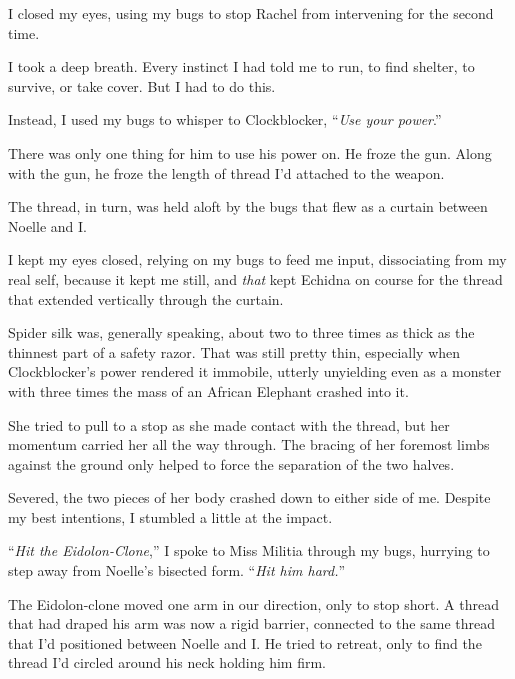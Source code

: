 I closed my eyes, using my bugs to stop Rachel from intervening for the second time.



I took a deep breath.  Every instinct I had told me to run, to find shelter, to survive, or take cover.  But I had to do this.



Instead, I used my bugs to whisper to Clockblocker, ``\emph{Use your power}.''



There was only one thing for him to use his power on.  He froze the gun.  Along with the gun, he froze the length of thread I'd attached to the weapon.



The thread, in turn, was held aloft by the bugs that flew as a curtain between Noelle and I.



I kept my eyes closed, relying on my bugs to feed me input, dissociating from my real self, because it kept me still, and \emph{that} kept Echidna on course for the thread that extended vertically through the curtain.



Spider silk was, generally speaking, about two to three times as thick as the thinnest part of a safety razor.  That was still pretty thin, especially when Clockblocker's power rendered it immobile, utterly unyielding even as a monster with three times the mass of an African Elephant crashed into it.



She tried to pull to a stop as she made contact with the thread, but her momentum carried her all the way through.  The bracing of her foremost limbs against the ground only helped to force the separation of the two halves.



Severed, the two pieces of her body crashed down to either side of me.  Despite my best intentions, I stumbled a little at the impact.



``\emph{Hit the Eidolon-Clone},'' I spoke to Miss Militia through my bugs, hurrying to step away from Noelle's bisected form.  ``\emph{Hit him hard.}''



The Eidolon-clone moved one arm in our direction, only to stop short.  A thread that had draped his arm was now a rigid barrier, connected to the same thread that I'd positioned between Noelle and I.  He tried to retreat, only to find the thread I'd circled around his neck holding him firm.



